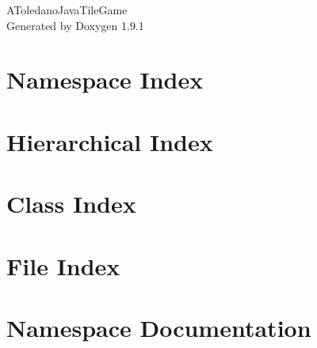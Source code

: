 \let\mypdfximage\pdfximage\def\pdfximage{\immediate\mypdfximage}\documentclass[twoside]{book}
\newcommand{\+}{\discretionary{\mbox{\scriptsize$\hookleftarrow$}}{}{}}
\newcommand{\clearemptydoublepage}{%
  \newpage{\pagestyle{empty}\cleardoublepage}%
}
\begin{document}
\raggedbottom

\hypersetup{pageanchor=false,
             bookmarksnumbered=true,
             pdfencoding=unicode
            }
\begin{titlepage}
\vspace*{7cm}
\begin{center}%
{\Large AToledano\+Java\+Tile\+Game }\\
\vspace*{1cm}
{\large Generated by Doxygen 1.9.1}\\
\end{center}
\end{titlepage}
\clearemptydoublepage
{}
\tableofcontents
\clearemptydoublepage
{}
\hypersetup{pageanchor=true}

\chapter{Namespace Index}

\chapter{Hierarchical Index}

\chapter{Class Index}

\chapter{File Index}

\chapter{Namespace Documentation}










\end{document}
